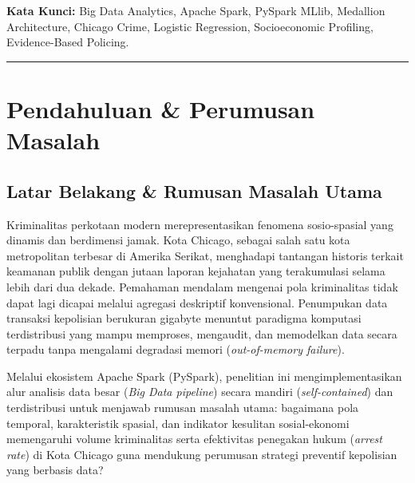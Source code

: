 \documentclass[11pt,a4paper]{article}
\begin{document}
\noindent\textbf{Kata Kunci:} Big Data Analytics, Apache Spark, PySpark MLlib, Medallion Architecture, Chicago Crime, Logistic Regression, Socioeconomic Profiling, Evidence-Based Policing.

\vspace{0.4cm}
\hrule
\vspace{0.4cm}

\section{Pendahuluan \& Perumusan Masalah}

\subsection{Latar Belakang \& Rumusan Masalah Utama}
Kriminalitas perkotaan modern merepresentasikan fenomena sosio-spasial yang dinamis dan berdimensi jamak. Kota Chicago, sebagai salah satu kota metropolitan terbesar di Amerika Serikat, menghadapi tantangan historis terkait keamanan publik dengan jutaan laporan kejahatan yang terakumulasi selama lebih dari dua dekade. Pemahaman mendalam mengenai pola kriminalitas tidak dapat lagi dicapai melalui agregasi deskriptif konvensional. Penumpukan data transaksi kepolisian berukuran gigabyte menuntut paradigma komputasi terdistribusi yang mampu memproses, mengaudit, dan memodelkan data secara terpadu tanpa mengalami degradasi memori (\textit{out-of-memory failure}).

Melalui ekosistem Apache Spark (PySpark), penelitian ini mengimplementasikan alur analisis data besar (\textit{Big Data pipeline}) secara mandiri (\textit{self-contained}) dan terdistribusi untuk menjawab rumusan masalah utama: bagaimana pola temporal, karakteristik spasial, dan indikator kesulitan sosial-ekonomi memengaruhi volume kriminalitas serta efektivitas penegakan hukum (\textit{arrest rate}) di Kota Chicago guna mendukung perumusan strategi preventif kepolisian yang berbasis data?
\end{document}
